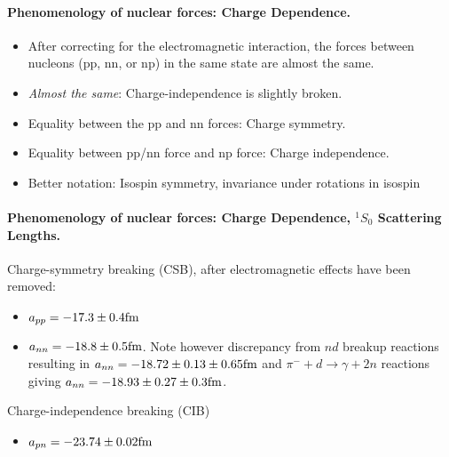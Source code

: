\documentclass[%
oneside,                 %
final,                   %
10pt]{article}
\begin{document}
\paragraph{Phenomenology of nuclear forces: Charge Dependence.}
\begin{itemize}
 \item After correcting for the electromagnetic interaction, the forces between nucleons (pp, nn, or np) in the same state are almost the same.

 \item \emph{Almost the same}: Charge-independence is slightly broken.

 \item Equality between the pp and nn forces: Charge symmetry.

 \item Equality between pp/nn force and np force: Charge independence.

 \item Better notation: Isospin symmetry, invariance under rotations in isospin
\end{itemize}

\noindent
\paragraph{Phenomenology of nuclear forces: Charge Dependence, $^1S_0$ Scattering Lengths.}
Charge-symmetry breaking (CSB), after electromagnetic effects
have been removed:
\begin{itemize}
\item $a_{pp}=  -17.3 \pm 0.4 \hspace{0.cm} \mathrm{fm}$

\item $a_{nn}=-18.8 \pm 0.5 \hspace{0.cm} \mathrm{fm}$. Note however discrepancy from $nd$ breakup reactions resulting in  $a_{nn}=-18.72 \pm 0.13 \pm 0.65 \hspace{0.cm} \mathrm{fm}$ and $\pi^- + d \rightarrow \gamma + 2n$ reactions giving  $a_{nn}=-18.93 \pm 0.27 \pm 0.3 \hspace{0.cm} \mathrm{fm}$.
\end{itemize}

\noindent
Charge-independence breaking (CIB)
\begin{itemize}
\item $a_{pn}=  -23.74 \pm 0.02 \hspace{0.cm} \mathrm{fm}$ 
\end{itemize}
\end{document}
